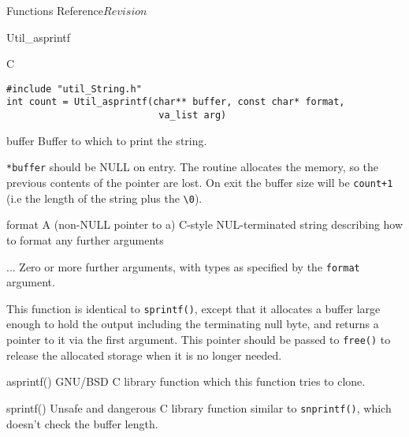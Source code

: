 \begin{cactuspart}{ Functions Reference}{}{$Revision$}
\begin{FunctionDescription}{Util\_asprintf}
\begin{SynopsisSection}
\begin{Synopsis}{C}
\begin{verbatim}
#include "util_String.h"
int count = Util_asprintf(char** buffer, const char* format,
                           va_list arg)
\end{verbatim}
\end{Synopsis}
\end{SynopsisSection}

\begin{ParameterSection}
\begin{Parameter}{buffer}
Buffer to which to print the string.

\verb|*buffer| should be NULL on entry.  The routine
allocates the memory, so the previous contents of
the pointer are lost.
On exit the buffer size will be \verb|count+1| (i.e
the length of the string plus the \verb|\0|).
\end{Parameter}
\begin{Parameter}{format}
A (non-NULL pointer to a) C-style NUL-terminated string describing
how to format any further arguments
\end{Parameter}
\begin{Parameter}{...}
Zero or more further arguments, with types as specified by the
\verb|format| argument.
\end{Parameter}
\end{ParameterSection}

\begin{Discussion}
This function is identical to \verb|sprintf()|, except that it allocates a
buffer large enough to hold the output including the terminating null byte,
and returns a pointer to it via the first argument. This pointer should be
passed to \verb|free()| to release the allocated storage when it is no longer
needed.
\end{Discussion}

\begin{SeeAlsoSection}
\begin{SeeAlso}{asprintf()}
GNU/BSD C library function which this function tries to clone.
\end{SeeAlso}
\begin{SeeAlso}{sprintf()}
Unsafe and dangerous C library function similar to \verb|snprintf()|,
which doesn't check the buffer length.
\end{SeeAlso}
\end{SeeAlsoSection}
\end{FunctionDescription}


\end{cactuspart}
